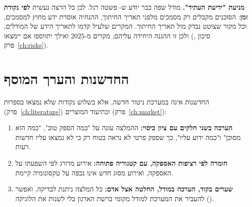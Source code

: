 \textbf{מניעת "ידיעת העתיד".} מודל שפה כבר יודע ש- פשטה רגל. לכן כל הרצה נעשית \textbf{לפי נקודת זמן}: הסוכנים מקבלים רק מסמכים מלפני תאריך החיתוך, ההנחיה אוסרת ידע מחוץ למסמכים, וכל מקור שצוטט נבדק מול תאריך החיתוך. המקרים שלעיל קדמו לתאריך הידע של המודלים, ולכן זו ההגנה היחידה עליהם; מקרים מ-2025 ואילך יתווספו אם יימצאו (סיכון , פרק~\ref{ch:risks}).

\section{החדשנות והערך המוסף}\label{sec:innovation}

החדשנות אינה במערכת ניטור חדשה, אלא בשלוש נקודות שלא נמצאו בספרות (פרק~\ref{ch:literature}) ובתיעוד המוצרים (פרק~\ref{ch:market}):
\begin{enumerate}
\item \textbf{הערכה בשני חלקים עם ציון כיסוי:} ההמלצה עונה על "כמה הספק טוב", "כמה הוא מסוכן" ו"כמה ידוע עליו", כך שספק פרטי לא נראה בטוח רק כי לא נמצאו עליו חדשות רעות.
\item \textbf{חומרה לפי רציפות האספקה, עם קטגוריה פתוחה:} אירוע מדורג לפי השפעתו על האספקה, ואירוע מסוג חדש אינו נכפה על טקסונומיה קיימת.
\item \textbf{שערים בקוד, הערכה במודל, החלטה אצל אדם:} כל המלצה ניתנת לבדיקה, ואפשר להעביר את המערכת למודל מקומי ברשת הארגון בלי לשנות את הלוגיקה ().
\end{enumerate}
